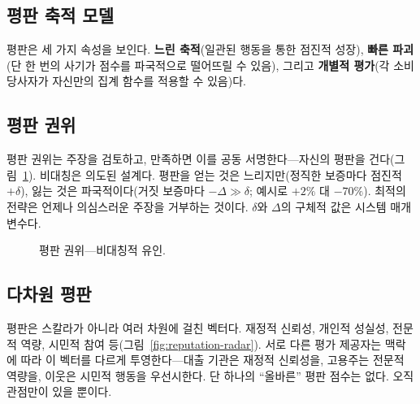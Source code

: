 \documentclass[11pt,a4paper,twocolumn]{article}
\begin{document}
\subsection{평판 축적 모델}

평판은 세 가지 속성을 보인다. \textbf{느린 축적}(일관된 행동을 통한 점진적 성장), \textbf{빠른 파괴}(단 한 번의 사기가 점수를 파국적으로 떨어뜨릴 수 있음), 그리고 \textbf{개별적 평가}(각 소비 당사자가 자신만의 집계 함수를 적용할 수 있음)다.

\subsection{평판 권위}

평판 권위는 주장을 검토하고, 만족하면 이를 공동 서명한다---자신의 평판을 건다(그림~\ref{fig:authority}). 비대칭은 의도된 설계다. 평판을 얻는 것은 느리지만(정직한 보증마다 점진적 $+\delta$), 잃는 것은 파국적이다(거짓 보증마다 $-\Delta \gg \delta$; 예시로 $+2\%$ 대 $-70\%$). 최적의 전략은 언제나 의심스러운 주장을 거부하는 것이다. $\delta$와 $\Delta$의 구체적 값은 시스템 매개변수다.

\begin{figure}[ht]
\centering
{}
\caption{평판 권위---비대칭적 유인.}
\label{fig:authority}
\end{figure}

\subsection{다차원 평판}

평판은 스칼라가 아니라 여러 차원에 걸친 벡터다. 재정적 신뢰성, 개인적 성실성, 전문적 역량, 시민적 참여 등(그림~\ref{fig:reputation-radar}). 서로 다른 평가 제공자는 맥락에 따라 이 벡터를 다르게 투영한다---대출 기관은 재정적 신뢰성을, 고용주는 전문적 역량을, 이웃은 시민적 행동을 우선시한다. 단 하나의 ``올바른'' 평판 점수는 없다. 오직 관점만이 있을 뿐이다.
\end{document}
